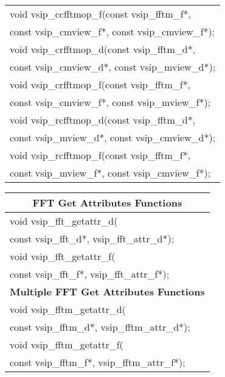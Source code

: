 {\begin{tabular}[H]{|l|}
void vsip\_ccfftmop\_f(const vsip\_fftm\_f*,\\*\hspace{.7cm} const vsip\_cmview\_f*, const vsip\_cmview\_f*);\\
void vsip\_crfftmop\_d(const vsip\_fftm\_d*,\\*\hspace{.7cm} const vsip\_cmview\_d*, const vsip\_mview\_d*);\\
void vsip\_crfftmop\_f(const vsip\_fftm\_f*,\\*\hspace{.7cm} const vsip\_cmview\_f*, const vsip\_mview\_f*);\\
void vsip\_rcfftmop\_d(const vsip\_fftm\_d*,\\*\hspace{.7cm} const vsip\_mview\_d*, const vsip\_cmview\_d*);\\
void vsip\_rcfftmop\_f(const vsip\_fftm\_f*,\\*\hspace{.7cm} const vsip\_mview\_f*, const vsip\_cmview\_f*);\\ \hline \end{tabular}
}
\clearpage
\hspace*{1.cm} {
\ttfamily
\begin{tabular}[H]{|l|}
\multicolumn{1}{c}{\rmfamily \bfseries FFT Get Attributes Functions}\\ \hline
void vsip\_fft\_getattr\_d(\\*\hspace{.7cm}const vsip\_fft\_d*, vsip\_fft\_attr\_d*);\\
void vsip\_fft\_getattr\_f(\\*\hspace{.7cm}const vsip\_fft\_f*, vsip\_fft\_attr\_f*);\\
\hline \multicolumn{1}{c}{\rmfamily \bfseries Multiple FFT Get Attributes Functions}\\ \hline
void vsip\_fftm\_getattr\_d(\\*\hspace{.7cm}const vsip\_fftm\_d*, vsip\_fftm\_attr\_d*);\\
void vsip\_fftm\_getattr\_f(\\*\hspace{.7cm}const vsip\_fftm\_f*, vsip\_fftm\_attr\_f*);\\
\hline\end{tabular}
}
\\\pyjvsiph
